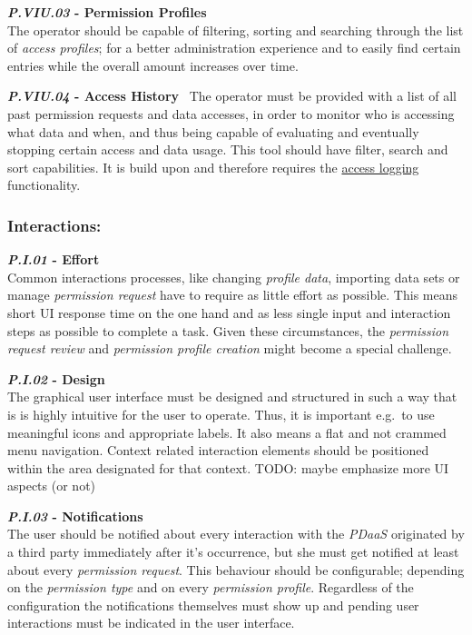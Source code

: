 \documentclass[12pt,english,a4paper,titlepage,cleardoublepage=empty,dottedtoc]{report}
\begin{document}
\textbf{\emph{\protect\hypertarget{pviu03}{}{P.VIU.03}} - Permission
Profiles}\\
The operator should be capable of filtering, sorting and searching
through the list of \emph{access profiles}; for a better administration
experience and to easily find certain entries while the overall amount
increases over time.

\textbf{\emph{\protect\hypertarget{pviu04}{}{P.VIU.04}} - Access
History}~ The operator must be provided with a list of all past
permission requests and data accesses, in order to monitor who is
accessing what data and when, and thus being capable of evaluating and
eventually stopping certain access and data usage. This tool should have
filter, search and sort capabilities. It is build upon and therefore
requires the \protect\hyperlink{pb01}{access logging} functionality.

\subsubsection{Interactions:}\label{interactions}

\textbf{\emph{\protect\hypertarget{pi01}{}{P.I.01}} - Effort}\\
Common interactions processes, like changing \emph{profile data},
importing data sets or manage \emph{permission request} have to require
as little effort as possible. This means short UI response time on the
one hand and as less single input and interaction steps as possible to
complete a task. Given these circumstances, the \emph{permission request
review} and \emph{permission profile creation} might become a special
challenge.

\textbf{\emph{\protect\hypertarget{pi02}{}{P.I.02}} - Design}\\
The graphical user interface must be designed and structured in such a
way that is is highly intuitive for the user to operate. Thus, it is
important e.g.~to use meaningful icons and appropriate labels. It also
means a flat and not crammed menu navigation. Context related
interaction elements should be positioned within the area designated for
that context. TODO: maybe emphasize more UI aspects (or not)

\textbf{\emph{\protect\hypertarget{pi03}{}{P.I.03}} - Notifications}\\
The user should be notified about every interaction with the
\emph{PDaaS} originated by a third party immediately after it's
occurrence, but she must get notified at least about every
\emph{permission request}. This behaviour should be configurable;
depending on the \emph{permission type} and on every \emph{permission
profile}. Regardless of the configuration the notifications themselves
must show up and pending user interactions must be indicated in the user
interface.
\end{document}

